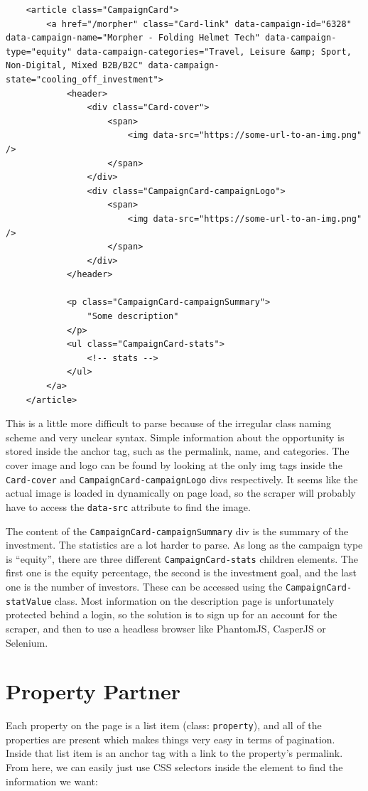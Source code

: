 \documentclass{article}
\begin{document}
\begin{verbatim}
    <article class="CampaignCard">
        <a href="/morpher" class="Card-link" data-campaign-id="6328" data-campaign-name="Morpher - Folding Helmet Tech" data-campaign-type="equity" data-campaign-categories="Travel, Leisure &amp; Sport, Non-Digital, Mixed B2B/B2C" data-campaign-state="cooling_off_investment">
            <header>
                <div class="Card-cover">
                    <span>
                        <img data-src="https://some-url-to-an-img.png" />
                    </span>
                </div>
                <div class="CampaignCard-campaignLogo">
                    <span>
                        <img data-src="https://some-url-to-an-img.png" />
                    </span>
                </div>
            </header>
            
            <p class="CampaignCard-campaignSummary">
                "Some description"
            </p>
            <ul class="CampaignCard-stats">
                <!-- stats -->
            </ul>
        </a>
    </article>
\end{verbatim}

This is a little more difficult to parse because of the irregular class naming
scheme and very unclear syntax. Simple information about the opportunity is
stored inside the anchor tag, such as the permalink, name, and categories. The
cover image and logo can be found by looking at the only img tags inside the
\texttt{Card-cover} and \texttt{CampaignCard-campaignLogo} divs respectively. It
seems like the actual image is loaded in dynamically on page load, so the
scraper will probably have to access the \texttt{data-src} attribute to find the
image.

The content of the \texttt{CampaignCard-campaignSummary} div is the summary of
the investment. The statistics are a lot harder to parse. As long as the
campaign type is ``equity'', there are three different
\texttt{CampaignCard-stats} children elements. The first one is the equity
percentage, the second is the investment goal, and the last one is the number of
investors. These can be accessed using the \texttt{CampaignCard-statValue}
class. Most information on the description page is unfortunately protected
behind a login, so the solution is to sign up for an account for the scraper,
and then to use a headless browser like PhantomJS, CasperJS or Selenium.

\section*{Property Partner}
Each property on the page is a list item (class: \texttt{property}), and all of
the properties are present which makes things very easy in terms of pagination.
Inside that list item is an anchor tag with a link to the property's permalink.
From here, we can easily just use CSS selectors inside the element to find the
information we want:
\end{document}
